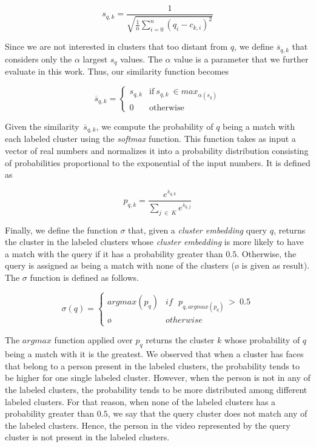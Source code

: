 \begin{equation}
\label{equation:similarity_raw}
    s_{q,k} = \frac{1}{\sqrt{\frac{1}{n}\sum_{i=0}^{n}{(q_i-c_{k,i})^2}}}
\end{equation}

Since we are not interested in clusters that too distant from $q$, we define $\overline{s}_{q,k}$ that considers only the $\alpha$ largest $s_q$ values. The $\alpha$ value is a parameter that we further evaluate in this work. 
Thus, our similarity function becomes

\begin{equation}
\label{equation:similarity}
    \overline{s}_{q,k} = \begin{cases}s_{q,k} & \text{if}~s_{q,k}~\in max_{\alpha(s_q)}\\0 & \text{otherwise}\end{cases}
\end{equation}

Given the similarity~$\overline{s}_{q,k}$, we compute the probability of $q$ being a match with each labeled cluster using the \emph{softmax} function.
This function takes as input a vector of real numbers and normalizes it into a probability distribution consisting of probabilities proportional to the exponential of the input numbers. 
It is defined as

\begin{equation}
\label{equation:probability}
    p_{q,k} = \frac{e^{\overline{s}_{q,k}}}{\sum_{j~\in~K}{e^{\overline{s}_{q,j}}}}
\end{equation}

Finally, we define the function $\sigma$ that, given a \emph{cluster embedding} query $q$, returns the cluster in the labeled clusters whose \emph{cluster embedding} is more likely to have a match with the query if it has a probability greater than $0.5$. Otherwise, the query is assigned as being a match with none of the clusters ($\text{\o}$ is given as result). The $\sigma$ function is defined as follows.

\begin{equation}
\label{equation:sigma}
    \sigma{(q)} = \begin{cases}argmax(p_q) & if~~~p_{q,argmax(p_q)}~>~0.5\\\text{\o} & otherwise\end{cases}
\end{equation}

The $argmax$ function applied over $p_q$ returns the cluster $k$ whose probability of $q$ being a match with it is the greatest. 
We observed that when a cluster has faces that belong to a person present in the labeled clusters, the probability tends to be higher for one single labeled cluster.
However, when the person is not in any of the labeled clusters, the probability tends to be more distributed among different labeled clusters.
For that reason, when none of the labeled clusters has a probability greater than $0.5$, we say that the query cluster does not match any of the labeled clusters.
Hence, the person in the video represented by the query cluster is not present in the labeled clusters.


